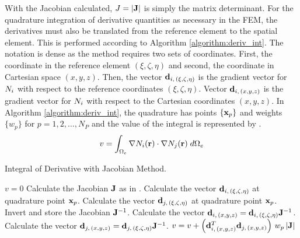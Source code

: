     With the Jacobian calculated, $J=\lvert\mathbf{J}\rvert$ is simply the matrix 
    determinant. For the quadrature integration of derivative quantities as
    necessary in the FEM, the derivatives must also be translated from the
    reference element to the spatial element. This is performed according to 
    Algorithm \ref{algorithm:deriv_int}. The notation is dense as the method
    requires two sets of coordinates. First, the coordinate in the reference
    element $(\xi,\zeta,\eta)$ and second, the coordinate in Cartesian space
    $(x,y,z)$.
    Then, the vector $\mathbf{d}_{i,\,(\xi,\zeta,\eta)}$ is the gradient vector for
    $N_i$ with respect to the reference coordinates $(\xi,\zeta,\eta)$.
    Vector $\mathbf{d}_{i,\,(x,y,z)}$ is the gradient vector for $N_i$ with
    respect to the Cartesian coordinates $(x,y,z)$. In Algorithm
    \ref{algorithm:deriv_int}, the quadrature has points $\{\mathbf{x}_p\}$ and weights
    $\{w_p\}$ for $p = 1,2,\ldots,N_P$ and the value of the integral is
    represented by .
    \begin{equation}
      \label{eq:deriv_integral}
      v = \int_{\Omega_e} \mathbf{\nabla} N_i(\mathbf{r}) \cdot \mathbf{\nabla} N_j(\mathbf{r}) \;
      d\Omega_e
    \end{equation}

    \begin{algorithm}
      \caption{Integral of Derivative with Jacobian Method.}
      \label{algorithm:deriv_int}
      \begin{algorithmic}[1]
        \State $v=0$
          \State Calculate the Jacobian $\mathbf{J}$ as in .
          \State Calculate the vector $\mathbf{d}_{i,\,(\xi,\zeta,\eta)}$ at quadrature
            point $\mathbf{x}_p$.
          \State Calculate the vector $\mathbf{d}_{j,\,(\xi,\zeta,\eta)}$ at quadrature
            point $\mathbf{x}_p$.
          \State Invert and store the Jacobian $\mathbf{J}^{-1}$.
          \State Calculate the vector $\mathbf{d}_{i,\,(x,y,z)} =
            \mathbf{d}_{i,\,(\xi,\zeta,\eta)} \mathbf{J}^{-1}$.
          \State Calculate the vector $\mathbf{d}_{j,\,(x,y,z)} =
            \mathbf{d}_{j,\,(\xi,\zeta,\eta)} \mathbf{J}^{-1}$.
          \State $v = v + \left(\mathbf{d}_{i,\,(x,y,z)}^{T} \mathbf{d}_{j,\,(x,y,z)}\right)
            \, w_p \, \lvert \mathbf{J} \rvert$
        \EndFor
      \end{algorithmic}
    \end{algorithm}

